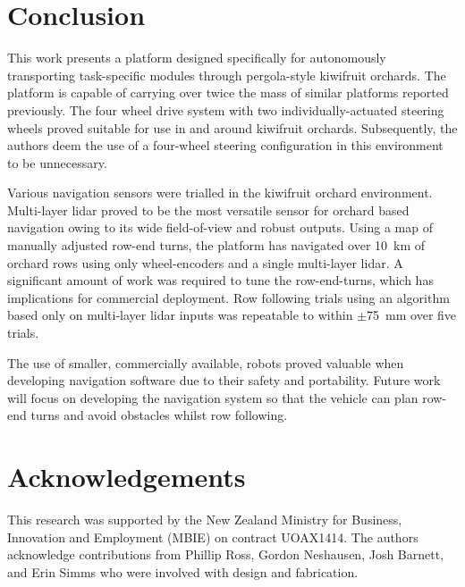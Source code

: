 \documentclass[preprint,authoryear,12pt]{elsarticle}
\begin{document}
\section{Conclusion}
    This work presents a platform designed specifically for autonomously transporting task-specific modules through pergola-style kiwifruit orchards.
    The platform is capable of carrying over twice the mass of similar platforms reported previously.
    The four wheel drive system with two individually-actuated steering wheels proved suitable for use in and around kiwifruit orchards.
    Subsequently, the authors deem the use of a four-wheel steering configuration in this environment to be unnecessary.

    Various navigation sensors were trialled in the kiwifruit orchard environment.
    Multi-layer lidar proved to be the most versatile sensor for orchard based navigation owing to its wide field-of-view and robust outputs.
    Using a map of manually adjusted row-end turns, the platform has navigated over \SI{10}{\kilo\meter} of orchard rows using only wheel-encoders and a single multi-layer lidar.
    A significant amount of work was required to tune the row-end-turns, which has implications for commercial deployment.
    Row following trials using an algorithm based only on multi-layer lidar inputs was repeatable to within $\pm$\SI{75}{\milli\meter} over five trials.

    The use of smaller, commercially available, robots proved valuable when developing navigation software due to their safety and portability.
    Future work will focus on developing the navigation system so that the vehicle can plan row-end turns and avoid obstacles whilst row following.


\section*{Acknowledgements}
This research was supported by the New Zealand Ministry for Business, Innovation and Employment (MBIE) on contract UOAX1414.
The authors acknowledge contributions from Phillip Ross, Gordon Neshausen, Josh Barnett, and Erin Simms who were involved with design and fabrication.



\end{document}
